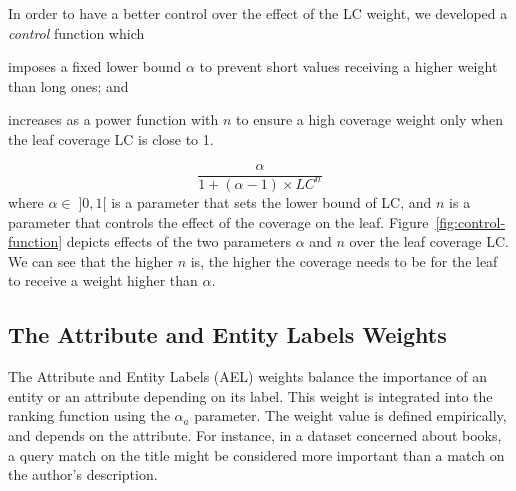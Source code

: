 In order to have a better control over the effect of the LC weight, we developed a \emph{control} function which
\begin{inparaenum}[(1)]
	\item imposes a fixed lower bound $\alpha$ to prevent short values receiving a higher weight than long ones; and
	\item increases as a power function with $n$ to ensure a high coverage weight only when the leaf coverage LC is close to 1.
\end{inparaenum}
\begin{equation}
\label{eq:lc-norm}
\frac{\alpha}{1+(\alpha-1)\times LC^n}
\end{equation}
where $\alpha \in \; ]0,1[$ is a parameter that sets the lower bound of LC, and $n$ is a parameter that controls the effect of the coverage on the leaf. Figure~\ref{fig:control-function} depicts effects of the two parameters $\alpha$ and $n$ over the leaf coverage LC. We can see that the higher $n$ is, the higher the coverage needs to be for the leaf to receive a weight higher than $\alpha$.

\subsection{The Attribute and Entity Labels Weights}
\label{sec:att-subj-w}

The Attribute and Entity Labels (AEL) weights balance the importance of an entity or an attribute depending on its label. This weight is integrated into the ranking function using the $\alpha_a$ parameter.
The weight value is defined empirically, and depends on the attribute. For instance, in a dataset concerned about books, a query match on the title might be considered more important than a match on the author's description.
